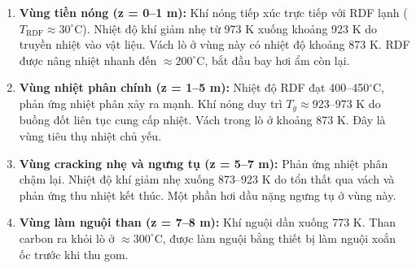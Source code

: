 \documentclass[../main.tex]{subfiles}
\begin{document}
\begin{enumerate}
  \item \textbf{Vùng tiền nóng (z = 0--1 m):} Khí nóng tiếp xúc trực tiếp với RDF lạnh ($T_{\text{RDF}} \approx 30^\circ$C). Nhiệt độ khí giảm nhẹ từ 973 K xuống khoảng 923 K do truyền nhiệt vào vật liệu. Vách lò ở vùng này có nhiệt độ khoảng 873 K. RDF được nâng nhiệt nhanh đến $\approx 200^\circ$C, bắt đầu bay hơi ẩm còn lại.
  \item \textbf{Vùng nhiệt phân chính (z = 1--5 m):} Nhiệt độ RDF đạt 400--450$^\circ$C, phản ứng nhiệt phân xảy ra mạnh. Khí nóng duy trì $T_g \approx 923$--$973$ K do buồng đốt liên tục cung cấp nhiệt. Vách trong lò ở khoảng 873 K. Đây là vùng tiêu thụ nhiệt chủ yếu.
  \item \textbf{Vùng cracking nhẹ và ngưng tụ (z = 5--7 m):} Phản ứng nhiệt phân chậm lại. Nhiệt độ khí giảm nhẹ xuống 873--923 K do tổn thất qua vách và phản ứng thu nhiệt kết thúc. Một phần hơi dầu nặng ngưng tụ ở vùng này.
  \item \textbf{Vùng làm nguội than (z = 7--8 m):} Khí nguội dần xuống 773 K. Than carbon ra khỏi lò ở $\approx 300^\circ$C, được làm nguội bằng thiết bị làm nguội xoắn ốc trước khi thu gom.
\end{enumerate}
\end{document}
